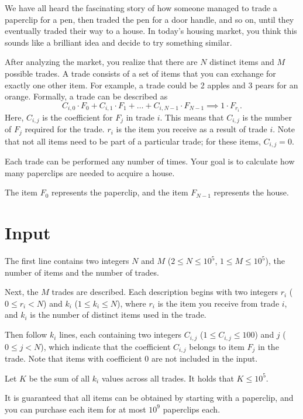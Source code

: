 
We have all heard the fascinating story of how someone managed to trade a paperclip for a pen, then traded the
pen for a door handle, and so on, until they eventually traded their way to a house. 
In today's housing market, you think this sounds like a brilliant idea and decide to try something similar.

After analyzing the market, you realize that there are $N$ distinct items and $M$ possible trades. 
A trade consists of a set of items that you can exchange for exactly one other item. 
For example, a trade could be 2 apples and 3 pears for an orange. Formally, a trade can be described as 
$$
C_{i,0} \cdot F_0 + C_{i,1} \cdot F_1 + \dots + C_{i,N-1} \cdot F_{N-1} \implies 1 \cdot F_{r_i}.
$$
Here, $C_{i,j}$ is the coefficient for $F_j$ in trade $i$. This means that $C_{i,j}$ is the number of $F_j$
required for the trade. $r_i$ is the item you receive as a result of trade $i$. 
Note that not all items need to be part of a particular trade; for these items, $C_{i,j} = 0$.

Each trade can be performed any number of times. Your goal is to calculate how many paperclips are needed to
acquire a house.

The item $F_0$ represents the paperclip, and the item $F_{N-1}$ represents the house.

\section*{Input}
The first line contains two integers $N$ and $M$ ($2 \leq N \leq 10^5$, $1 \leq M \leq 10^5$), the number of
items and the number of trades.

Next, the $M$ trades are described. Each description begins with two integers $r_i$ ($0 \leq r_i < N$)
and $k_i$ ($1 \leq k_i \leq N$),
where $r_i$ is the item you receive from trade $i$, and $k_i$ is the number of distinct items used in the trade.

Then follow $k_i$ lines, each containing two integers $C_{i,j}$ ($1 \leq C_{i,j} \leq 100$) and $j$ ($0 \leq j < N$),
which indicate that the coefficient $C_{i,j}$ belongs to item $F_j$ in the trade. Note that 
items with coefficient $0$ are not included in the input.

Let $K$ be the sum of all $k_i$ values across all trades. It holds that $K \leq 10^5$.

It is guaranteed that all items can be obtained by starting with a paperclip, and you can purchase each item for
at most $10^9$ paperclips each.

